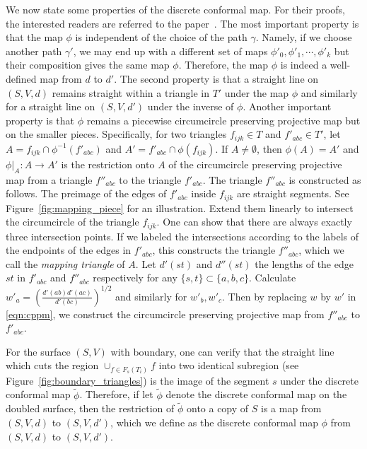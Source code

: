 \documentclass[11pt]{article}
\begin{document}
We now state some properties of the discrete conformal map. For their proofs, the interested readers
are referred to the paper~\cite{glsw2}. The most important property is that the map $\phi$ is 
independent of the choice of the path $\gamma$. Namely, if we choose another path $\gamma'$, 
we may end up with a different set of maps $\phi'_0, \phi'_1, \cdots, \phi'_k$ but their composition 
gives the same map $\phi$. Therefore, the map $\phi$ is indeed a well-defined map from $d$ to $d'$. 
The second property is that a straight line on $(S, V, d)$ 
remains straight within a triangle in $T'$ under the map $\phi$ and similarly for a straight line 
on $(S, V, d')$ under the inverse of $\phi$. Another important property is
that $\phi$ remains a piecewise circumcircle preserving projective map but on the smaller pieces. 
Specifically, for two triangles $f_{ijk} \in T$ and $f'_{abc}\in T'$, let $A = f_{ijk} \cap \phi^{-1}(f'_{abc})$ 
and $A' = f'_{abc} \cap \phi(f_{ijk})$. If $A \neq \emptyset$, then $\phi(A) = A'$ and 
$\phi|_A: A\rightarrow A'$ is the restriction onto $A$ of the circumcircle preserving projective
map from a triangle $f''_{abc}$ to the triangle $f'_{abc}$. The triangle $f''_{abc}$ is constructed as 
follows.  The preimage of the edges of $f'_{abc}$ inside $f_{ijk}$ are straight segments. 
See Figure~\ref{fig:mapping_piece} for an illustration. 
Extend them linearly to intersect the circumcircle of the triangle $f_{ijk}$. One can show that there are always 
exactly three intersection points. If we labeled the intersections according to the labels of the endpoints of 
the edges in $f'_{abc}$, this constructs the triangle $f''_{abc}$, which we call the {\it mapping triangle} of $A$. 
Let $d'(st)$ and $d''(st)$ the lengths of the edge $st$ in $f'_{abc}$ and $f''_{abc}$ respectively for 
any $\{s, t\} \subset \{a, b, c\}$.  Calculate $w'_a = \left(\frac{d'(ab)d'(ac)}{d'(bc)}\right)^{1/2}$ and similarly 
for $w'_b, w'_c$. Then by replacing $w$ by $w'$ in \eqref{eqn:cppm}, we construct the circumcircle preserving
projective map from $f''_{abc}$ to $f'_{abc}$. 



For the surface $(S, V)$ with boundary, one can verify that the straight line which cuts the region 
$\cup_{f\in F_s(T_i)} f$ into two identical subregion (see Figure~\ref{fig:boundary_triangles}) is 
the image of the segment $s$ under the discrete conformal map $\tilde{\phi}$. 
Therefore, if let $\tilde{\phi}$ denote the discrete conformal map on the doubled surface, then the restriction 
of $\tilde{\phi}$ onto a copy of $S$ is a map from $(S, V, d)$ to $(S, V, d')$, which we define as the discrete 
conformal map $\phi$ from $(S, V, d)$ to $(S, V, d')$. 
\end{document}
